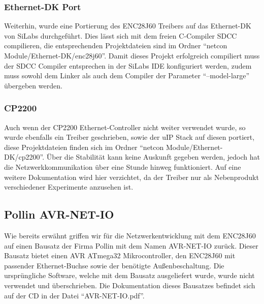 \documentclass[a4paper,14pt,headsepline]{scrartcl}
\begin{document}
\subsubsection{Ethernet-DK Port}
Weiterhin, wurde eine Portierung des ENC28J60 Treibers auf das Ethernet-DK von SiLabs durchgeführt. Dies lässt sich mit dem freien C-Compiler SDCC compilieren, die entsprechenden Projektdateien sind im Ordner "`netcon Module/Ethernet-DK/enc28j60"'. Damit dieses Projekt erfolgreich compiliert muss der SDCC Compiler entsprechen in der SiLabs IDE konfiguriert werden, zudem muss sowohl dem Linker als auch dem Compiler der Parameter "`--model-large"' übergeben werden.

\subsubsection{CP2200}
Auch wenn der CP2200 Ethernet-Controller nicht weiter verwendet wurde, so wurde ebenfalls ein Treiber geschrieben, sowie der uIP Stack auf diesen portiert, diese Projektdateien finden sich im Ordner "`netcon Module/Ethernet-DK/cp2200"'. Über die Stabilität kann keine Auskunft gegeben werden, jedoch hat die Netzwerkkommunikation über eine Stunde hinweg funktioniert. Auf eine weitere Dokumentation wird hier verzichtet, da der Treiber nur als Nebenprodukt verschiedener Experimente anzusehen ist.

\subsection{Pollin AVR-NET-IO}
Wie bereits erwähnt griffen wir für die Netzwerkentwicklung mit dem ENC28J60 auf einen Bausatz der Firma Pollin mit dem Namen AVR-NET-IO zurück. Dieser Bausatz bietet einen AVR ATmega32 Mikrocontroller, den ENC28J60 mit passender Ethernet-Buchse sowie der benötigte Außenbeschaltung. Die ursprüngliche Software, welche mit dem Bausatz ausgeliefert wurde, wurde nicht verwendet und überschrieben. Die Dokumentation dieses Bausatzes befindet sich auf der CD in der Datei "`AVR-NET-IO.pdf"'.

\newpage
\end{document}
